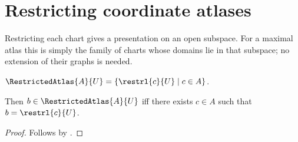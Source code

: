 \section{Restricting coordinate atlases}



Restricting each chart gives a presentation on an open subspace. For a
maximal atlas this is simply the family of charts whose domains lie in that
subspace; no extension of their graphs is needed.

\begin{definition}\label{restricted_atlas}
    $\RestrictedAtlas{A}{U}=\{\restrl{c}{U}\mid c\in A\}$.
\end{definition}

\begin{theorem}\label{restricted_atlas_iff}
    Then $b\in\RestrictedAtlas{A}{U}$ iff there exists $c\in A$ such that $b=\restrl{c}{U}$.
\end{theorem}
\begin{proof}
    Follows by .
\end{proof}

